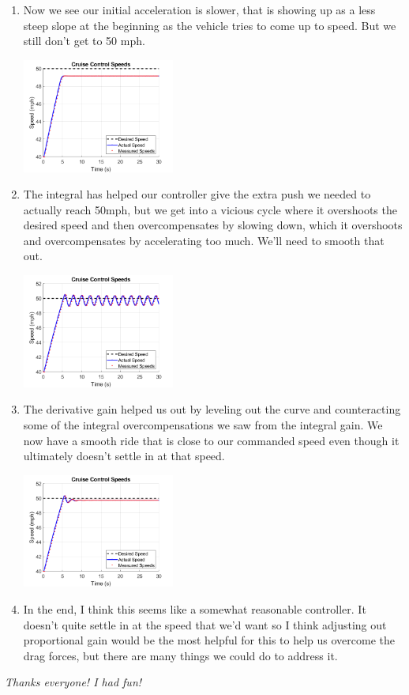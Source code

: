 \documentclass[11pt]{article}
\begin{document}
\begin{enumerate}[label=\alph*)]
		\item Now we see our initial acceleration is slower, that is showing up as a less steep slope at the beginning as the vehicle tries to come up to speed. But we still don't get to 50 mph.\\
			\begin{center}
				\includegraphics[width = 5cm]{Part_c.png}
			\end{center} 
		\item The integral has helped our controller give the extra push we needed to actually reach 50mph, but we get into a vicious cycle where it overshoots the desired speed and then overcompensates by slowing down, which it overshoots and overcompensates by accelerating too much. We'll need to smooth that out.\\
			\begin{center}
				\includegraphics[width = 5cm]{Part_d.png}
			\end{center}
		\item The derivative gain helped us out by leveling out the curve and counteracting some of the integral overcompensations we saw from the integral gain. We now have a smooth ride that is close to our commanded speed even though it ultimately doesn't settle in at that speed.\\
			\begin{center}
				\includegraphics[width = 5cm]{Part_e.png}
			\end{center}
		\item In the end, I think this seems like a somewhat reasonable controller. It doesn't quite settle in at the speed that we'd want so I think adjusting out proportional gain would be the most helpful for this to help us overcome the drag forces, but there are many things we could do to address it. 
	\end{enumerate}
	\begin{center}
		\vfill
		\textit{Thanks everyone! I had fun!}
	\end{center}
\end{document}
